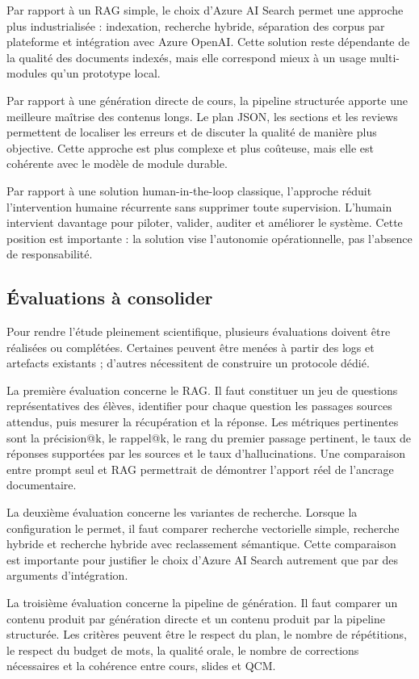 Par rapport à un RAG simple, le choix d'Azure AI Search permet une approche plus
industrialisée : indexation, recherche hybride, séparation des corpus par plateforme et
intégration avec Azure OpenAI. Cette solution reste dépendante de la qualité des documents
indexés, mais elle correspond mieux à un usage multi-modules qu'un prototype local.

Par rapport à une génération directe de cours, la pipeline structurée apporte une meilleure
maîtrise des contenus longs. Le plan JSON, les sections et les reviews permettent de
localiser les erreurs et de discuter la qualité de manière plus objective. Cette approche
est plus complexe et plus coûteuse, mais elle est cohérente avec le modèle de module
durable.

Par rapport à une solution human-in-the-loop classique, l'approche réduit l'intervention
humaine récurrente sans supprimer toute supervision. L'humain intervient davantage pour
piloter, valider, auditer et améliorer le système. Cette position est importante : la solution
vise l'autonomie opérationnelle, pas l'absence de responsabilité.

\subsection{Évaluations à consolider}

Pour rendre l'étude pleinement scientifique, plusieurs évaluations doivent être réalisées
ou complétées. Certaines peuvent être menées à partir des logs et artefacts existants ;
d'autres nécessitent de construire un protocole dédié.

La première évaluation concerne le RAG. Il faut constituer un jeu de questions
représentatives des élèves, identifier pour chaque question les passages sources attendus,
puis mesurer la récupération et la réponse. Les métriques pertinentes sont la précision@k,
le rappel@k, le rang du premier passage pertinent, le taux de réponses supportées par les
sources et le taux d'hallucinations. Une comparaison entre prompt seul et RAG permettrait
de démontrer l'apport réel de l'ancrage documentaire.

La deuxième évaluation concerne les variantes de recherche. Lorsque la configuration le
permet, il faut comparer recherche vectorielle simple, recherche hybride et recherche
hybride avec reclassement sémantique. Cette comparaison est importante pour justifier
le choix d'Azure AI Search autrement que par des arguments d'intégration.

La troisième évaluation concerne la pipeline de génération. Il faut comparer un contenu
produit par génération directe et un contenu produit par la pipeline structurée. Les critères
peuvent être le respect du plan, le nombre de répétitions, le respect du budget de mots,
la qualité orale, le nombre de corrections nécessaires et la cohérence entre cours, slides
et QCM.

